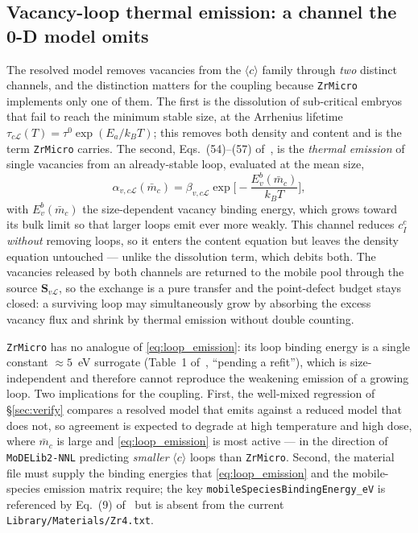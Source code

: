 \documentclass[11pt]{article}
\newcommand{\kb}{k_{B}}
\newcommand{\Lcal}{\mathcal{L}}
\newcommand{\ZrMicro}{\texttt{ZrMicro}}
\newcommand{\MoDELib}{\texttt{MoDELib2-NNL}}
\newcommand{\code}[1]{\texttt{#1}}
\begin{document}
\subsection{Vacancy-loop thermal emission: a channel the 0-D model omits}
\label{sec:emission}

The resolved model removes vacancies from the $\langle c\rangle$ family through
\emph{two} distinct channels, and the distinction matters for the coupling
because \ZrMicro{} implements only one of them. The first is the dissolution of
sub-critical embryos that fail to reach the minimum stable size, at the Arrhenius
lifetime $\tau_{c\Lcal}(T)=\tau^0\exp(E_a/\kb T)$; this removes both density and
content and is the term \ZrMicro{} carries. The second, Eqs.~(54)--(57)
of~\cite{PoGhoniem2026D1M1}, is the \emph{thermal emission} of single vacancies
from an already-stable loop, evaluated at the mean size,
\begin{equation}
\label{eq:loop_emission}
    \alpha_{v,c\Lcal}(\bar m_c)
    =
    \beta_{v,c\Lcal}\exp\!\Big[-\frac{E^{b}_{v}(\bar m_c)}{\kb T}\Big],
\end{equation}
with $E^{b}_{v}(\bar m_c)$ the size-dependent vacancy binding energy, which grows
toward its bulk limit so that larger loops emit ever more weakly. This channel
reduces $c^{c}_I$ \emph{without} removing loops, so it enters the content
equation but leaves the density equation untouched --- unlike the dissolution
term, which debits both. The vacancies released by both channels are returned to
the mobile pool through the source $\mathbf S_{v\Lcal}$, so the exchange is a
pure transfer and the point-defect budget stays closed: a surviving loop may
simultaneously grow by absorbing the excess vacancy flux and shrink by thermal
emission without double counting.

\ZrMicro{} has no analogue of \eqref{eq:loop_emission}: its loop binding energy
is a single constant $\approx5$~eV surrogate (Table~1
of~\cite{PoGhoniem2026D1M1}, ``pending a refit''), which is size-independent and
therefore cannot reproduce the weakening emission of a growing loop. Two
implications for the coupling. First, the well-mixed regression of
\S\ref{sec:verify} compares a resolved model that emits against a reduced model
that does not, so agreement is expected to degrade at high temperature and high
dose, where $\bar m_c$ is large and \eqref{eq:loop_emission} is most active ---
in the direction of \MoDELib{} predicting \emph{smaller} $\langle c\rangle$ loops
than \ZrMicro{}. Second, the material file must supply the binding energies that
\eqref{eq:loop_emission} and the mobile-species emission matrix require; the key
\code{mobileSpeciesBindingEnergy\_eV} is referenced by Eq.~(9)
of~\cite{PoGhoniem2026D1M1} but is absent from the current
\code{Library/Materials/Zr4.txt}.
\end{document}
